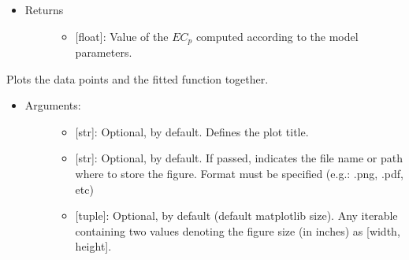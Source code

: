 \documentclass[letterpaper,10pt,english]{sphinxmanual}
\begin{document}
\begin{fulllineitems}
\begin{fulllineitems}
\begin{itemize}
\begin{description}
\begin{itemize}
\end{itemize}

\end{description}

\item {} \begin{description}
\item[{Returns}] \leavevmode\begin{itemize}
\item {} 
{[}float{]}: Value of the \(EC_{p}\) computed according
to the model parameters.

\end{itemize}

\end{description}

\end{itemize}

\end{fulllineitems}


\begin{fulllineitems}
\label{\detokenize{models:data_tools.models.DoseResponse.plot}}
Plots the data points and the fitted function together.
\begin{itemize}
\item {} \begin{description}
\item[{Arguments:}] \leavevmode\begin{itemize}
\item {} 
 {[}str{]}: Optional,  by default. Defines the
plot title.

\item {} 
 {[}str{]}: Optional,  by default. If
passed, indicates the file name or path where to store the
figure. Format must be specified (e.g.: .png, .pdf, etc)

\item {} 
 {[}tuple{]}: Optional,  by default (default
matplotlib size). Any iterable containing two values
denoting the figure size (in inches) as {[}width, height{]}.


\end{itemize}
\end{description}
\end{itemize}
\end{fulllineitems}
\end{fulllineitems}
\end{document}
